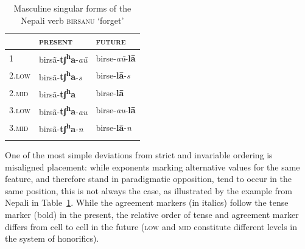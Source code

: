 \documentclass[output=paper
	        ,collection
	        ,collectionchapter
 	        ,biblatex
                ,babelshorthands
                ,newtxmath
                ,draftmode
                ,colorlinks, citecolor=brown
]{langscibook}
\begin{document}
\begin{exe}
\begin{xlist}
\begin{exe}
\begin{xlist}
\begin{table}[ht!]
  \begin{center}
    \begin{tabular}{lll}
      \lsptoprule
      & \textsc{present} & \textsc{future}\\
      \midrule
      1 & birsã-\textbf{tʃ\textsuperscript{h}a}-\emph{aũ} & 
                                                                birse-\emph{aũ}-\textbf{lā}\\
      \textsc{2.low} &
                 birsã-\textbf{tʃ\textsuperscript{h}a}-\emph{s} & 
                                                                      birse-\textbf{lā}-\emph{s}\\
      \textsc{2.mid} & 
                  birsã-\textbf{tʃ\textsuperscript{h}a} & 
                                                         birse-\textbf{lā}\\
      \textsc{3.low} & 
                  birsã-\textbf{tʃ\textsuperscript{h}a}-\emph{au} & 
                                                                        birse-\emph{au}-\textbf{lā}\\
      \textsc{3.mid} &
                 birsã-\textbf{tʃ\textsuperscript{h}a}-\emph{n} & 
                                                                      birse-\textbf{lā}-\emph{n}\\
      \lspbottomrule
    \end{tabular}
  \end{center}
  \caption{Masculine singular forms of the Nepali verb \textsc{birsanu} ‘forget’}
  \label{tab:Nepali}
\end{table}

One of the most simple deviations from strict and invariable ordering
is misaligned placement: while exponents marking alternative values
for the same feature, and therefore stand in paradigmatic opposition,
tend to occur in the same position, this is not always the case, as
illustrated by the example from Nepali in Table~\ref{tab:Nepali}.  
While the agreement markers (in italics) follow the tense marker (bold) in the present,
the relative order of tense and agreement marker differs from cell to
cell in the future (\textsc{low} and \textsc{mid} constitute
different levels in the system of honorifics).


\end{xlist}
\end{exe}
\end{xlist}
\end{exe}
\end{document}
